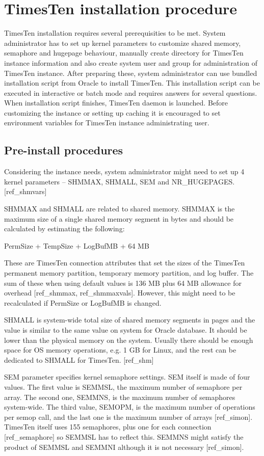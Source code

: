 \documentclass[11pt, letterpaper]{article}            %
\begin{document}
\section{TimesTen installation procedure}
TimesTen installation requires several prerequisities to be met. System administrator has to set up kernel parameters to customize shared memory, semaphore and hugepage behaviour, manually create directory for TimesTen instance information and also create system user and group for administration of TimesTen instance. After preparing these, system administrator can use bundled installation script from Oracle to install TimesTen. This installation script can be executed in interactive or batch mode and requires answers for several questions. When installation script finishes, TimesTen daemon is launched. Before customizing the instance or setting up caching it is encouraged to set environment variables for TimesTen instance administrating user.
\subsection{Pre-install procedures}
Considering the instance needs, system administrator might need to set up 4 kernel parameters – SHMMAX, SHMALL, SEM and NR_HUGEPAGES. [ref_shmvars]

SHMMAX and SHMALL are related to shared memory. SHMMAX is the maximum size of a single shared memory segment in bytes and should be calculated by estimating the following:

                PermSize + TempSize + LogBufMB + 64 MB

These are TimesTen connection attributes that set the sizes of the TimesTen permanent memory partition, temporary memory partition, and log buffer. The sum of these when using default values is 136 MB plus 64 MB allowance for overhead [ref_shmmax, ref_shmmaxvals]. However, this might need to be recalculated if PermSize or LogBufMB is changed.

SHMALL is system-wide total size of shared memory segments in pages and the value is similar to the same value on system for Oracle database. It should be lower than the physical memory on the system. Usually there should be enough space for OS memory operations, e.g. 1 GB for Linux, and the rest can be dedicated to SHMALL for TimesTen. [ref_shm]

SEM parameter specifies kernel semaphore settings. SEM itself is made of four values. The first value is SEMMSL, the maximum number of semaphore per array. The second one, SEMMNS, is the maximum number of semaphores system-wide. The third value, SEMOPM, is the maximum number of operations per semop call, and the last one is the maximum number of arrays [ref_simon]. TimesTen itself uses 155 semaphores, plus one for each connection [ref_semaphore] so SEMMSL has to reflect this. SEMMNS might satisfy the product of SEMMSL and SEMMNI although it is not necessary [ref_simon].
\end{document}
